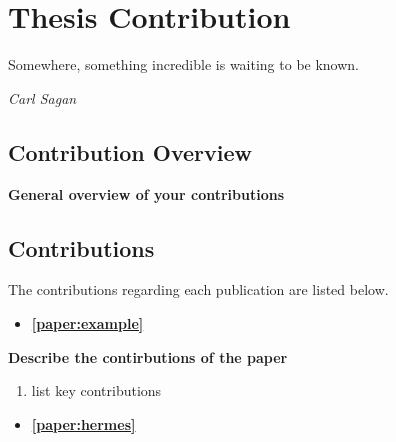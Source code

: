 
		
\chapter{Thesis Contribution}
\label{ch.contribution}
	\vspace{-2 cm}
\epigraph{Somewhere, something incredible is waiting to be known.}{\textit{Carl Sagan}}

\section{Contribution Overview}

\textbf{General overview of your contributions}

\section{Contributions}

The contributions regarding each publication are listed below.

\begin{itemize}
  \item \textbf{\ref{paper:example}}
\end{itemize}
\vspace{-1 em}
\textbf{Describe the contirbutions of the paper}

\begin{enumerate}
\item list key contributions
\end{enumerate}


\begin{itemize}
  \item \textbf{\ref{paper:hermes}}
\end{itemize}
\vspace{-1 em}

